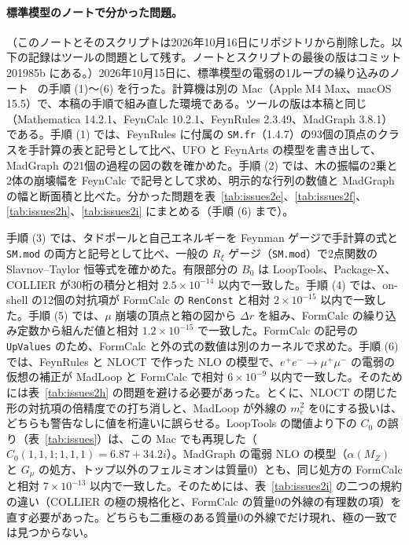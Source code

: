 \documentclass[a4paper,10pt]{ltjsarticle}
\begin{document}
\paragraph{標準模型のノートで分かった問題。}（このノートとそのスクリプトは2026年10月16日にリポジトリから削除した。以下の記録はツールの問題として残す。ノートとスクリプトの最後の版はコミット 201985b にある。）2026年10月15日に、標準模型の電弱の1ループの繰り込みのノート~\cite{smnote} の手順 (1)〜(6) を行った。計算機は別の Mac（Apple M4 Max、macOS 15.5）で、本稿の手順で組み直した環境である。ツールの版は本稿と同じ（Mathematica 14.2.1、FeynCalc 10.2.1、FeynRules 2.3.49、MadGraph 3.8.1）である。手順 (1) では、FeynRules に付属の \texttt{SM.fr}（1.4.7）の93個の頂点のクラスを手計算の表と記号として比べ、UFO と FeynArts の模型を書き出して、MadGraph の21個の過程の図の数を確かめた。手順 (2) では、木の振幅の2乗と2体の崩壊幅を FeynCalc で記号として求め、明示的な行列の数値と MadGraph の幅と断面積と比べた。分かった問題を表~\ref{tab:issues2e}、\ref{tab:issues2f}、\ref{tab:issues2h}、\ref{tab:issues2i} にまとめる（手順 (6) まで）。

手順 (3) では、タドポールと自己エネルギーを Feynman ゲージで手計算の式と \texttt{SM.mod} の両方と記号として比べ、一般の $R_\xi$ ゲージ（\texttt{SM.mod}）で2点関数の Slavnov--Taylor 恒等式を確かめた。有限部分の $B_0$ は LoopTools、Package-X、COLLIER が30桁の積分と相対 $2.5\times10^{-14}$ 以内で一致した。手順 (4) では、on-shell の12個の対抗項が FormCalc の \texttt{RenConst} と相対 $2\times10^{-15}$ 以内で一致した。手順 (5) では、$\mu$ 崩壊の頂点と箱の図から $\Delta r$ を組み、FormCalc の繰り込み定数から組んだ値と相対 $1.2\times10^{-15}$ で一致した。FormCalc の記号の \texttt{UpValues} のため、FormCalc と外の式の数値は別のカーネルで求めた。手順 (6) では、FeynRules と NLOCT で作った NLO の模型で、$e^+e^-\to\mu^+\mu^-$ の電弱の仮想の補正が MadLoop と FormCalc で相対 $6\times10^{-9}$ 以内で一致した。そのためには表~\ref{tab:issues2h} の問題を避ける必要があった。とくに、NLOCT の閉じた形の対抗項の倍精度での打ち消しと、MadLoop が外線の $m_e^2$ を0にする扱いは、どちらも警告なしに値を桁違いに誤らせる。LoopTools の閾値より下の $C_0$ の誤り（表~\ref{tab:issues}）は、この Mac でも再現した（$C_0(1,1,1;1,1,1)=6.87+34.2i$）。MadGraph の電弱 NLO の模型（$\alpha(M_Z)$ と $G_\mu$ の処方、トップ以外のフェルミオンは質量0）とも、同じ処方の FormCalc と相対 $7\times10^{-13}$ 以内で一致した。そのためには、表~\ref{tab:issues2i} の二つの規約の違い（COLLIER の極の規格化と、FormCalc の質量0の外線の有理数の項）を直す必要があった。どちらも二重極のある質量0の外線でだけ現れ、極の一致では見つからない。
\end{document}
